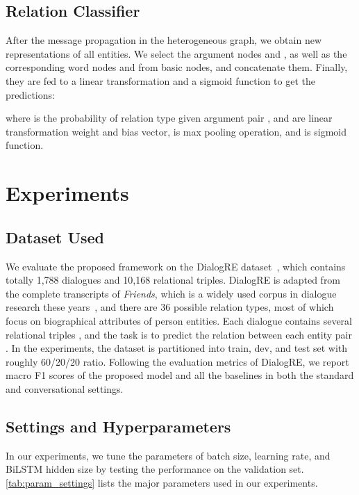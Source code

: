 \documentclass[letterpaper]{article} \usepackage{aaai21}  \usepackage{times}  \usepackage{helvet} \usepackage{courier}  \usepackage[hyphens]{url}  \usepackage{graphicx} \urlstyle{rm} \def\UrlFont{\rm}  \usepackage{natbib}  \usepackage{caption} \frenchspacing  \setlength{\pdfpagewidth}{8.5in}  \setlength{\pdfpageheight}{11in}
\begin{document}
\subsection{Relation Classifier}
After the message propagation in the heterogeneous graph, we obtain new representations of all entities. We select the argument nodes  and , as well as the corresponding word nodes  and  from basic nodes, and concatenate them. Finally, they are fed to a linear transformation and a sigmoid function to get the predictions:

where  is the probability of relation type  given argument pair ,  and  are linear transformation weight and bias vector,  is max pooling operation, and  is sigmoid function.

\section{Experiments}
\label{experiment}
\subsection{Dataset Used}
We evaluate the proposed framework on the DialogRE dataset~\cite{yu2020dialogue}, which contains totally 1,788 dialogues and 10,168 relational triples. DialogRE is adapted from the complete transcripts of \textit{Friends}, which is a widely used corpus in dialogue research these years~\cite{chen-etal-2017-robust,zhou2018they,yang2019friendsqa}, and there are 36 possible relation types, most of which focus on biographical attributes of person entities. Each dialogue contains several relational triples , and the task is to predict the relation  between each entity pair . In the experiments, the dataset is partitioned into train, dev, and test set with roughly 60/20/20 ratio. Following the evaluation metrics of DialogRE, we report macro F1 scores of the proposed model and all the baselines in both the standard and conversational settings.



\subsection{Settings and Hyperparameters}
In our experiments, we tune the parameters of batch size, learning rate, and BiLSTM hidden size by testing the performance on the validation set. \cref{tab:param_settings} lists the major parameters used in our experiments.
\end{document}
